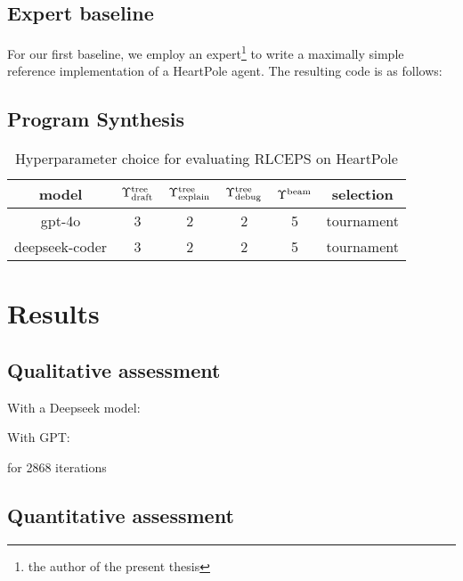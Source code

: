 \newpage
\subsection{Expert baseline}

For our first baseline, we employ an expert\footnote{the author of the present thesis} to write a maximally simple reference implementation of a HeartPole agent.
The resulting code is as follows:



\newpage
\subsection{Program Synthesis}

\begin{table}
    \centering
    \begin{tabular}{|c|c|c|c|c|c|}
        model & $\Upsilon^\text{tree}_\text{draft}$ & $\Upsilon^\text{tree}_\text{explain}$ & $\Upsilon^\text{tree}_\text{debug}$ & $\Upsilon^\text{beam}$ & selection \\
        \midrule
        gpt-4o & 3 & 2 & 2 & 5 & tournament \\
        deepseek-coder & 3 & 2 & 2 & 5 & tournament
    \end{tabular}
    \caption{Hyperparameter choice for evaluating RLCEPS on HeartPole}
    \label{tab:rlceps-heartpole}
\end{table}



\newpage
\section{Results}

\subsection{Qualitative assessment}

With a Deepseek model:



With GPT:



for 2868 iterations

\subsection{Quantitative assessment}

